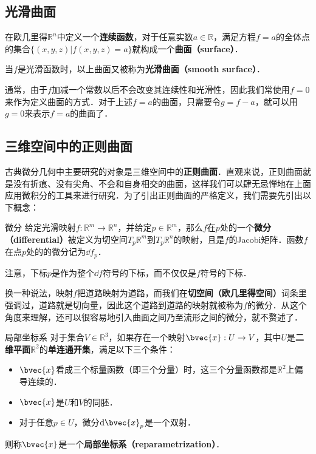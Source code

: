 
\subsection{光滑曲面}

在欧几里得$\mathbb{R}^n$中定义一个\textbf{连续函数}，对于任意实数$a\in\mathbb{R}$，满足方程$f=a$的全体点的集合$\{(x, y, z)|f(x, y, z)=a\}$就构成一个\textbf{曲面（surface）}．

当$f$是光滑函数时，以上曲面又被称为\textbf{光滑曲面（smooth surface）}．

通常，由于$f$加减一个常数以后不会改变其连续性和光滑性，因此我们常使用$f=0$来作为定义曲面的方式．对于上述$f=a$的曲面，只需要令$g=f-a$，就可以用$g=0$来表示$f=a$的曲面了．

\subsection{三维空间中的正则曲面}

古典微分几何中主要研究的对象是三维空间中的\textbf{正则曲面}．直观来说，正则曲面就是没有折痕、没有尖角、不会和自身相交的曲面，这样我们可以肆无忌惮地在上面应用微积分的工具来进行研究．为了引出正则曲面的严格定义，我们需要先引出以下概念：

\begin{definition}{微分}
给定光滑映射$f:\mathbb{R}^m\to\mathbb{R}^n$，并给定$p\in\mathbb{R}^m$，那么$f$在$p$处的一个\textbf{微分（differential）}被定义为切空间$T_p\mathbb{R}^m$到$T_p\mathbb{R}^n$的映射，且是$f$的Jacobi矩阵．函数$f$在点$p$处的的微分记为$\dd f_p$．
\end{definition}

注意，下标$p$是作为整个$\dd f$符号的下标，而不仅仅是$f$符号的下标．

换一种说法，映射$f$把道路映射为道路，而我们在\textbf{切空间（欧几里得空间）}词条里强调过，道路就是切向量，因此这个道路到道路的映射就被称为$f$的微分．从这个角度来理解，还可以很容易地引入曲面之间乃至流形之间的微分，就不赘述了．


\begin{definition}{局部坐标系}
对于集合$V\in \mathbb{R}^3$，如果存在一个映射$\bvec{x}:U\to V$，其中$U$是\textbf{二维平面}$\mathbb{R}^2$的\textbf{单连通开集}，满足以下三个条件：
\begin{itemize}
\item $\bvec{x}$看成三个标量函数（即三个分量）时，这三个分量函数都是$\mathbb{R}^2$上偏导连续的．
\item $\bvec{x}$是$U$和$V$的同胚．
\item 对于任意$p\in U$，微分$\mathrm{d}\bvec{x}_p$是一个双射．
\end{itemize}
则称$\bvec{x}$是一个\textbf{局部坐标系（reparametrization）}．
\end{definition}

